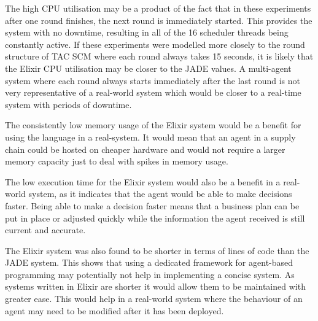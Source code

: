 The high CPU utilisation may be a product of the fact that in these experiments after one round finishes, the next round is immediately started.
This provides the system with no downtime, resulting in all of the 16 scheduler threads being constantly active.
If these experiments were modelled more closely to the round structure of TAC SCM where each round always takes 15 seconds, it is likely that the Elixir CPU utilisation may be closer to the JADE values.
A multi-agent system where each round always starts immediately after the last round is not very representative of a real-world system which would be closer to a real-time system with periods of downtime.

The consistently low memory usage of the Elixir system would be a benefit for using the language in a real-system.
It would mean that an agent in a supply chain could be hosted on cheaper hardware and would not require a larger memory capacity just to deal with spikes in memory usage.

The low execution time for the Elixir system would also be a benefit in a real-world system, as it indicates that the agent would be able to make decisions faster.
Being able to make a decision faster means that a business plan can be put in place or adjusted quickly while the information the agent received is still current and accurate.

The Elixir system was also found to be shorter in terms of lines of code than the JADE system.
This shows that using a dedicated framework for agent-based programming may potentially not help in implementing a concise system.
As systems written in Elixir are shorter it would allow them to be maintained with greater ease.
This would help in a real-world system where the behaviour of an agent may need to be modified after it has been deployed.
